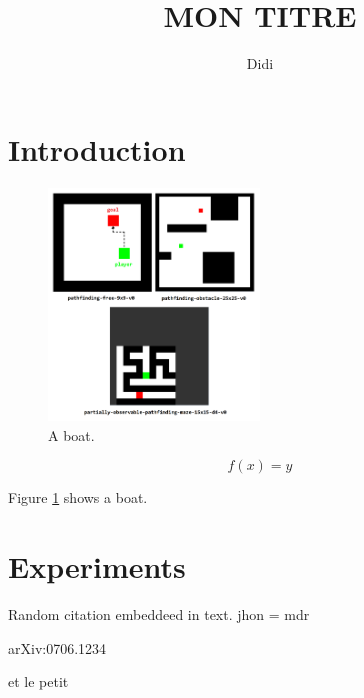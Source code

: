 \documentclass[12pt]{article}
\begin{document}
\title{MON TITRE}
\author{Didi}
\maketitle

\newpage
\tableofcontents
\newpage


\section{Introduction}


\begin{figure}
    \centering
    \includegraphics[width=0.5\textwidth]{env_examples.png}
    \caption{A boat.}
    \label{fig:boat1}
\end{figure}
\[
    f(x) = y
\]

Figure \ref{fig:boat1} shows a boat.


\section{Experiments}
Random citation \cite{DUMMY:1} embeddeed in text.
jhon = \cite{jhonlenon} mdr

arXiv:0706.1234


et le petit \cite{lol:1}

\newpage


 

\end{document}
